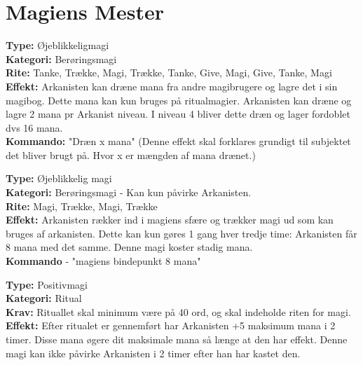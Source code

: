 \section*{Magiens Mester}

\begin{mesterMagi*}
\textbf{Type:} Øjeblikkeligmagi\\
\textbf{Kategori:} Berøringsmagi\\
\textbf{Rite:} Tanke, Trække, Magi, Trække, Tanke, Give, Magi, Give, Tanke, Magi\\
\textbf{Effekt:} Arkanisten kan dræne mana fra andre magibrugere og lagre det i sin magibog. Dette mana kan kun bruges på ritualmagier. Arkanisten kan dræne og lagre 2 mana pr Arkanist niveau. I niveau 4 bliver dette dræn og lager fordoblet dvs 16 mana.\\
\textbf{Kommando:} "Dræn x mana" (Denne effekt skal forklares grundigt til subjektet det bliver brugt på. Hvor x er mængden af mana drænet.)
\end{mesterMagi*}

\begin{mesterMagi*}
\textbf{Type:} Øjeblikkelig magi\\
\textbf{Kategori:} Berøringsmagi - Kan kun påvirke Arkanisten.\\
\textbf{Rite:} Magi, Trække, Magi, Trække\\
\textbf{Effekt:} Arkanisten rækker ind i magiens sfære og trækker magi ud som kan bruges af arkanisten. Dette kan kun gøres 1 gang hver tredje time: Arkanisten får 8 mana med det samme. Denne magi koster stadig mana.\\
\textbf{Kommando} - "magiens bindepunkt 8 mana"
\end{mesterMagi*}

\begin{mesterMagi*}[Energilager]
\textbf{Type:} Positivmagi\\
\textbf{Kategori:} Ritual\\
\textbf{Krav:} Rituallet skal minimum være på 40 ord, og skal indeholde riten for magi.\\
\textbf{Effekt:}  Efter ritualet er gennemført har Arkanisten +5 maksimum mana i 2 timer. Disse mana øgere dit maksimale mana så længe at den har effekt. Denne magi kan ikke påvirke Arkanisten i 2 timer efter han har kastet den.
\end{mesterMagi*}

